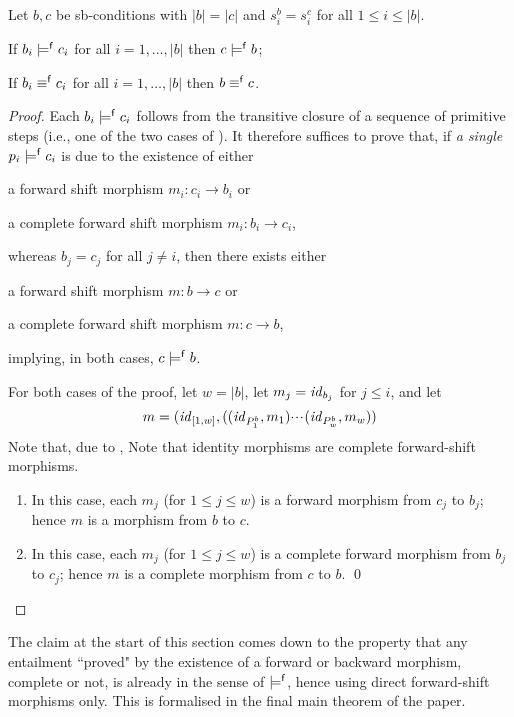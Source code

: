 \begin{proposition}
Let $b,c$ be sb-conditions with $|b|=|c|$ and $s^b_i=s^c_i$ for all $1\leq i\leq |b|$.
\begin{enumerateS}
\item If $b_i\models^{\mathsf f} c_i$ for all $i=1,\ldots,|b|$ then $c\models^{\mathsf f} b$;
\item If $b_i\equiv^{\mathsf f} c_i$ for all $i=1,\ldots,|b|$ then $b\equiv^{\mathsf f} c$.
\end{enumerateS}
\end{proposition}
%
\begin{proof}
Each $b_i\models^{\mathsf f} c_i$ follows from the transitive closure of a sequence of primitive steps (i.e., one of the two cases of ). It therefore suffices to prove that, if \emph{a single} $p_i\models^{\mathsf f} c_i$ is due to the existence of either
\begin{inumerate}
\item a forward shift morphism $m_i:c_i\to b_i$ or
\item a complete forward shift morphism $m_i:b_i\to c_i$,
\end{inumerate}
whereas $b_j=c_j$ for all $j\neq i$, then there exists either
\begin{inumerate}
\item a forward shift morphism $m:b\to c$ or 
\item a complete forward shift morphism $m:c\to b$,
\end{inumerate}
implying, in both cases, $c\models^{\mathsf f} b$.

\smallskip
For both cases of the proof, let $w=|b|$, let $m_j=\mathit{id}_{b_j}$ for $j\leq i$, and let
%
\[ m = (\mathit{id}_{[1,w]},((\mathit{id}_{P^b_1},m_1){\cdotp\mkern-2mu\cdotp\mkern-2mu\cdotp\mkern1mu} (\mathit{id}_{P^b_w},m_w)) \]
%
\iffull
Note that, due to ,
\else
Note that 
\fi
identity morphisms are complete forward-shift morphisms.
%
\begin{enumerate}[label=\emph{(\roman*)}]
\item In this case, each $m_j$ (for $1\leq j\leq w$) is a forward morphism from $c_j$ to $b_j$; hence $m$ is a morphism from $b$ to $c$.

\item In this case, each $m_j$ (for $1\leq j\leq w$) is a complete forward morphism from $b_j$ to $c_j$; hence $m$ is a complete morphism from $c$ to $b$.
\qed
\end{enumerate}
\end{proof}
%
The claim at the start of this section comes down to the property that any entailment ``proved" by the existence of a forward or backward morphism, complete or not, is already {\fprovable} in the sense of $\models^{\mathsf f}$, hence using direct forward-shift morphisms only. This is formalised in the final main theorem of the paper.

